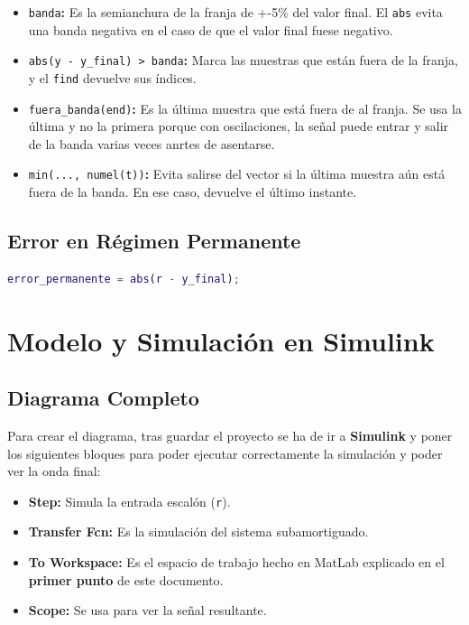 \documentclass[12pt,a4paper]{article}
\let\oldsection\section
\renewcommand{\section}{\clearpage\oldsection}
\newcommand{\codigo}[1]{\colorbox{bgcmd}{\texttt{#1}}}
\begin{document}
\begin{itemize}[label=$\bullet$]
  \item \codigo{banda}\textbf{:} Es la semianchura de la franja de +-5\% del valor final. El \codigo{abs} evita una banda negativa en el caso de que el valor final fuese negativo.
  \item \codigo{abs(y - y\_final) > banda}\textbf{:} Marca las muestras que están fuera de la franja, y el \codigo{find} devuelve sus índices.
  \item \codigo{fuera\_banda(end)}\textbf{:} Es la última muestra que está fuera de al franja. Se usa la última y no la primera porque con oscilaciones, la señal puede entrar y salir de la banda varias veces anrtes de asentarse.
  \item \codigo{min(..., numel(t))}\textbf{:} Evita salirse del vector si la última muestra aún está fuera de la banda. En ese caso, devuelve el último instante.
\end{itemize}

\subsection{Error en Régimen Permanente}

\begin{lstlisting}[language=Matlab]
error_permanente = abs(r - y_final);
\end{lstlisting}

\section{Modelo y Simulación en Simulink}

\subsection{Diagrama Completo}

Para crear el diagrama, tras guardar el proyecto se ha de ir a \textbf{Simulink} y poner los siguientes bloques para poder ejecutar correctamente la simulación y poder ver la onda final:

\begin{itemize}[label=$\bullet$]
  \item \textbf{Step:} Simula la entrada escalón (\codigo{r}).
  \item \textbf{Transfer Fcn:} Es la simulación del sistema subamortiguado.
  \item \textbf{To Workspace:} Es el espacio de trabajo hecho en MatLab explicado en el \textbf{primer punto} de este documento.
  \item \textbf{Scope:} Se usa para ver la señal resultante.
\end{itemize}
\end{document}
